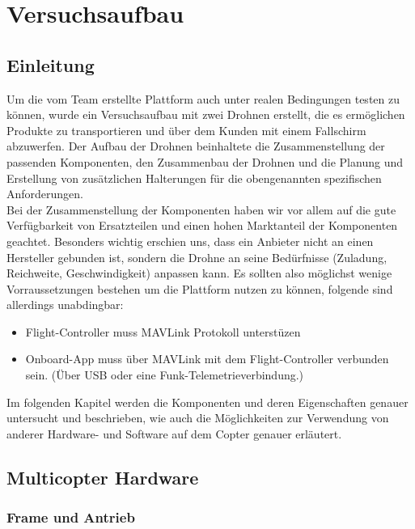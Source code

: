 \chapter{Versuchsaufbau}

\section{Einleitung}

Um die vom Team erstellte Plattform auch unter realen Bedingungen testen zu können, wurde ein Versuchsaufbau mit zwei Drohnen erstellt, die es ermöglichen Produkte zu transportieren und über dem Kunden mit einem Fallschirm abzuwerfen. Der Aufbau der Drohnen beinhaltete die Zusammenstellung der passenden Komponenten, den Zusammenbau der Drohnen und die Planung und Erstellung von zusätzlichen Halterungen für die obengenannten spezifischen Anforderungen.\\

Bei der Zusammenstellung der Komponenten haben wir vor allem auf die gute Verfügbarkeit von Ersatzteilen und einen hohen Marktanteil der Komponenten geachtet. Besonders wichtig erschien uns, dass ein Anbieter nicht an einen Hersteller gebunden ist, sondern die Drohne an seine Bedürfnisse (Zuladung, Reichweite, Geschwindigkeit) anpassen kann. Es sollten also möglichst wenige Vorraussetzungen bestehen um die Plattform nutzen zu können, folgende sind allerdings unabdingbar:

\begin{itemize}

\item Flight-Controller muss \Gls{MAVLink} Protokoll unterstüzen
\item Onboard-App muss über MAVLink mit dem Flight-Controller verbunden sein. (Über USB oder eine Funk-Telemetrieverbindung.)
\end{itemize}

Im folgenden Kapitel werden die Komponenten und deren Eigenschaften genauer untersucht und beschrieben, wie auch die Möglichkeiten zur Verwendung von anderer Hardware- und Software auf dem Copter genauer erläutert.

\section{Multicopter Hardware}

\subsection{Frame und Antrieb}

